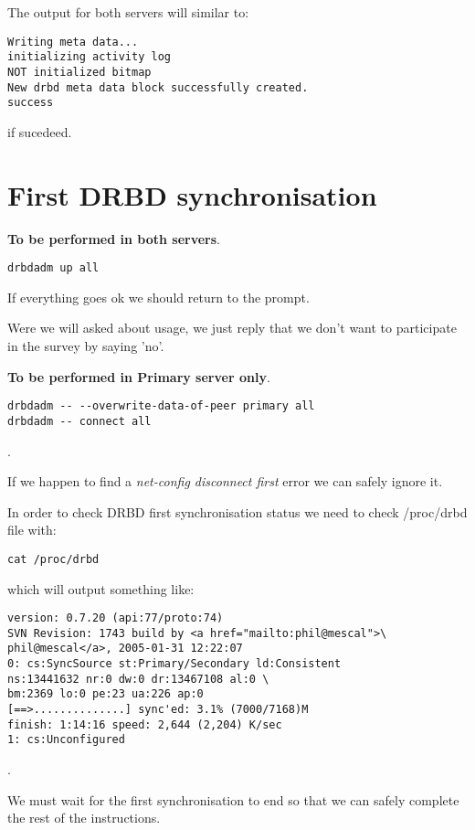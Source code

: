 The output for both servers will similar to:
\begin{verbatim}
Writing meta data...
initializing activity log
NOT initialized bitmap
New drbd meta data block successfully created.
success
\end{verbatim}
if sucedeed.

\section {First DRBD synchronisation}
\textbf{To be performed in both servers}.
\begin{verbatim}
drbdadm up all
\end{verbatim}
If everything goes ok we should return to the prompt.

Were we will asked about usage, we just reply that we don't want to participate in the survey by saying 'no'.

\textbf{To be performed in Primary server only}.
\begin{verbatim}
drbdadm -- --overwrite-data-of-peer primary all
drbdadm -- connect all
\end{verbatim}
.

If we happen to find a \textit{net-config disconnect first} error we can safely ignore it.

In order to check DRBD first synchronisation status we need to check /proc/drbd file with:
\begin{verbatim}
cat /proc/drbd
\end{verbatim}
which will output something like:
\begin{verbatim}
version: 0.7.20 (api:77/proto:74)
SVN Revision: 1743 build by <a href="mailto:phil@mescal">\
phil@mescal</a>, 2005-01-31 12:22:07
0: cs:SyncSource st:Primary/Secondary ld:Consistent
ns:13441632 nr:0 dw:0 dr:13467108 al:0 \
bm:2369 lo:0 pe:23 ua:226 ap:0
[==>..............] sync'ed: 3.1% (7000/7168)M
finish: 1:14:16 speed: 2,644 (2,204) K/sec
1: cs:Unconfigured
\end{verbatim}
.

We must wait for the first synchronisation to end so that we can safely complete the rest of the instructions.






